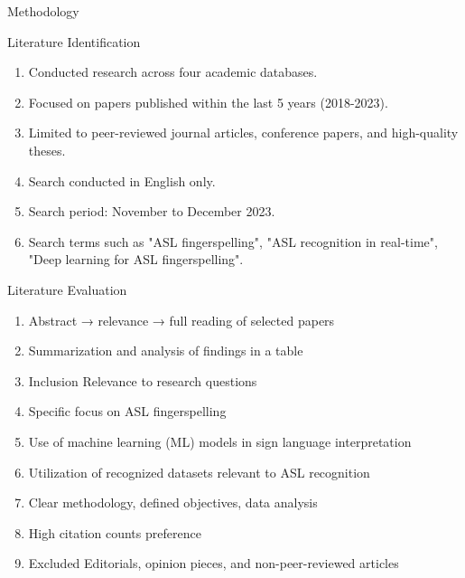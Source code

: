 \documentclass[xcolor={cmyk}]{beamer} %
\begin{document}
\begin{frame}[t]
\begin{columns}[t]
\begin{column}{0.3\textwidth}
\begin{block}{Methodology}
\begin{minipage}{0.48\linewidth}
					Literature Identification
					\begin{enumerate}
						\item Conducted research across four academic databases.
						\item Focused on papers published within the last 5 years (2018-2023).
						\item Limited to peer-reviewed journal articles, conference papers, and high-quality theses.
						\item Search conducted in English only.
						\item Search period: November to December 2023.
						\item Search terms such as "ASL fingerspelling", "ASL recognition in real-time", "Deep learning for ASL fingerspelling".
					\end{enumerate}
				\end{minipage}
				\hfill %
				\begin{minipage}{0.48\linewidth}
					Literature Evaluation
					\begin{enumerate}
						\item Abstract → relevance → full reading of selected papers
						\item Summarization and analysis of findings in a table
						\item \alert {Inclusion} Relevance to research questions
						\item Specific focus on ASL fingerspelling
						\item Use of machine learning (ML) models in sign language interpretation
						\item Utilization of recognized datasets relevant to ASL recognition
						\item Clear methodology, defined objectives, data analysis
						\item High citation counts preference
						\item \alert {Excluded} Editorials, opinion pieces, and non-peer-reviewed articles
					\end{enumerate}
				\end{minipage}
			\end{block}



\end{column}
\end{columns}
\end{frame}
\end{document}
